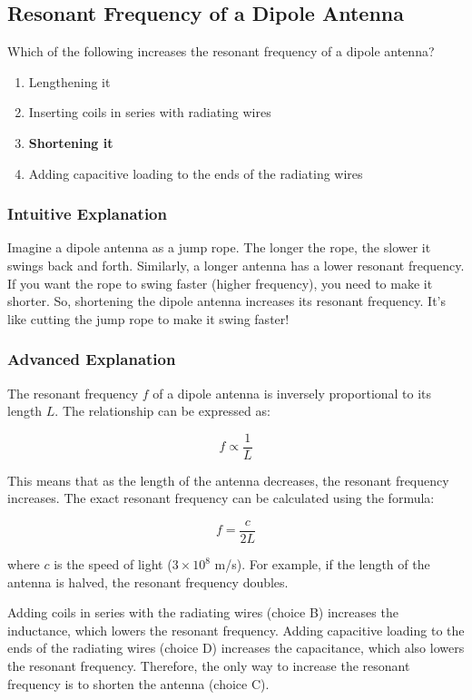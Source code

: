 \subsection{Resonant Frequency of a Dipole Antenna}
\label{T9A05}

\begin{tcolorbox}[colback=gray!10!white,colframe=black!75!black,title=T9A05]
Which of the following increases the resonant frequency of a dipole antenna?
\begin{enumerate}[label=\Alph*)]
    \item Lengthening it
    \item Inserting coils in series with radiating wires
    \item \textbf{Shortening it}
    \item Adding capacitive loading to the ends of the radiating wires
\end{enumerate}
\end{tcolorbox}

\subsubsection{Intuitive Explanation}
Imagine a dipole antenna as a jump rope. The longer the rope, the slower it swings back and forth. Similarly, a longer antenna has a lower resonant frequency. If you want the rope to swing faster (higher frequency), you need to make it shorter. So, shortening the dipole antenna increases its resonant frequency. It's like cutting the jump rope to make it swing faster!

\subsubsection{Advanced Explanation}
The resonant frequency \( f \) of a dipole antenna is inversely proportional to its length \( L \). The relationship can be expressed as:

\[
f \propto \frac{1}{L}
\]

This means that as the length of the antenna decreases, the resonant frequency increases. The exact resonant frequency can be calculated using the formula:

\[
f = \frac{c}{2L}
\]

where \( c \) is the speed of light (\( 3 \times 10^8 \) m/s). For example, if the length of the antenna is halved, the resonant frequency doubles. 

Adding coils in series with the radiating wires (choice B) increases the inductance, which lowers the resonant frequency. Adding capacitive loading to the ends of the radiating wires (choice D) increases the capacitance, which also lowers the resonant frequency. Therefore, the only way to increase the resonant frequency is to shorten the antenna (choice C).

